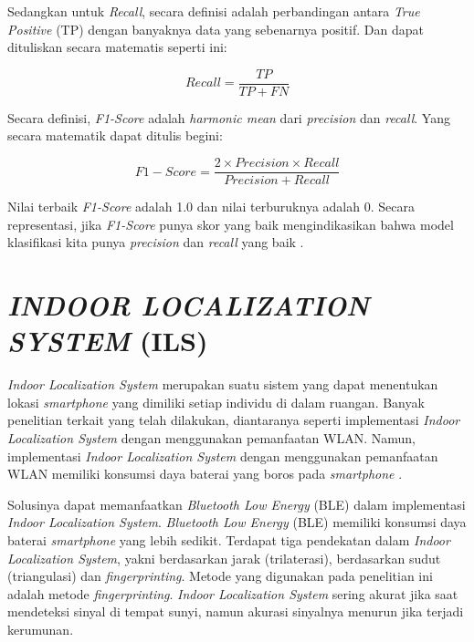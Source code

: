 Sedangkan untuk \textit{Recall}, secara definisi adalah perbandingan antara \textit{True Positive} (TP) dengan banyaknya data yang sebenarnya positif. Dan dapat dituliskan secara matematis seperti ini:

\begin{equation}
	\label{rumusrecall}
	Recall = \frac{TP}{TP+FN}
\end{equation}
\vspace{0.1cm}

Secara definisi, \textit{F1-Score} adalah \textit{harmonic mean} dari \textit{precision} dan \textit{recall}. Yang secara matematik dapat ditulis begini:

\begin{equation}
	\label{rumusf1score}
	F1-Score = \frac{2 \times Precision \times Recall}{Precision+Recall}
\end{equation}
\vspace{0.1cm}

Nilai terbaik \textit{F1-Score} adalah 1.0 dan nilai terburuknya adalah 0. Secara representasi, jika \textit{F1-Score} punya skor yang baik mengindikasikan bahwa model klasifikasi kita punya \textit{precision} dan \textit{recall} yang baik \citep{Ariza18}.


\section{\uppercase{\textit{INDOOR LOCALIZATION SYSTEM} (ILS)}}
\textit{Indoor Localization System} merupakan suatu sistem yang dapat menentukan lokasi \textit{smartphone} yang dimiliki setiap individu di dalam ruangan. Banyak penelitian terkait yang telah dilakukan, diantaranya seperti implementasi \textit{Indoor Localization System} dengan menggunakan pemanfaatan WLAN. Namun, implementasi \textit{Indoor Localization System} dengan menggunakan pemanfaatan WLAN memiliki konsumsi daya baterai yang boros pada \textit{smartphone} \citep{Sun2019}.
\par Solusinya dapat memanfaatkan \textit{Bluetooth Low Energy }(BLE) dalam implementasi \textit{Indoor Localization System}. \textit{Bluetooth Low Energy }(BLE) memiliki konsumsi daya baterai \textit{smartphone} yang lebih sedikit. Terdapat tiga pendekatan dalam \textit{Indoor Localization System}, yakni berdasarkan jarak (trilaterasi), berdasarkan sudut (triangulasi) dan \textit{fingerprinting}. Metode yang digunakan pada penelitian ini adalah metode \textit{fingerprinting}. \textit{Indoor Localization System} sering akurat jika saat mendeteksi sinyal di tempat sunyi, namun akurasi sinyalnya menurun jika terjadi kerumunan\citep{Santos2021}.

